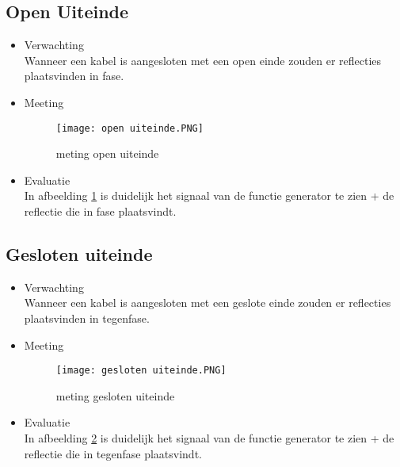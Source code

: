 \subsection{Open Uiteinde}
\begin{itemize}
    \item Verwachting\\
    Wanneer een kabel is aangesloten met een open einde zouden er reflecties plaatsvinden in fase.
    \item Meeting
    \begin{figure}[H]
        \centering
        \texttt{[image: open uiteinde.PNG]}
        \caption{meting open uiteinde}
        \label{fig:meting open uiteinde}
    \end{figure}
    \item Evaluatie\\
    In afbeelding \ref{fig:meting open uiteinde} is duidelijk het signaal van de functie generator te zien + de reflectie die in fase plaatsvindt.
\end{itemize}

\subsection{Gesloten uiteinde}
\begin{itemize}
    \item Verwachting\\
    Wanneer een kabel is aangesloten met een geslote einde zouden er reflecties plaatsvinden in tegenfase.
    \item Meeting
    \begin{figure}[H]
        \centering
        \texttt{[image: gesloten uiteinde.PNG]}
        \caption{meting gesloten uiteinde}
        \label{fig:meting gesloten uiteinde}
    \end{figure}
    \item Evaluatie\\
    In afbeelding \ref{fig:meting gesloten uiteinde} is duidelijk het signaal van de functie generator te zien + de reflectie die in tegenfase plaatsvindt.
\end{itemize}

